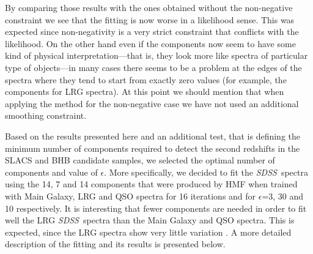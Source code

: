 \documentclass[12pt,preprint]{aastex}
\newcommand{\project}[1]{\textsl{#1}}
\newcommand{\sdss}{\project{SDSS}}
\newcommand{\SDSS}{\sdss}
\begin{document}
By comparing those results with the ones obtained without the
non-negative constraint we see that the fitting is now worse in a likelihood sense. This was
expected since non-negativity is a very strict constraint that
conflicts with the likelihood.  On the other hand even if the
components now seem to have some kind of physical interpretation---that
is, they look more like spectra of particular type of objects---in many
cases there seems to be a problem at the edges of the spectra where
they tend to start from exactly zero values (for example, the
components for LRG spectra). At this point we should mention that when
applying the method for the non-negative case we have not used an
additional smoothing constraint.

Based on the results presented here and an additional test, that is 
defining the minimum number of components required to detect the 
second redshifts in the SLACS and BHB candidate samples, we selected 
the optimal number of components and value of $\epsilon$. More specifically, 
we decided to fit the \SDSS\ spectra using the 14, 7 and 14 components 
that were produced by HMF when trained with Main Galaxy, LRG
and QSO spectra for 16 iterations and for $\epsilon$=3, 30 and 10
respectively. It is interesting that fewer components are needed in
order to fit well the LRG \SDSS\ spectra than the Main
Galaxy and QSO spectra.  This is expected, since the LRG spectra show
very little variation \citep{eishogg}. A more detailed description of
the fitting and its results is presented below.
\end{document}

